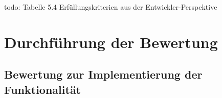 todo: Tabelle 5.4 Erfüllungskriterien aus der Entwickler-Perspektive

\section{Durchführung der Bewertung}

\subsection{Bewertung zur Implementierung der Funktionalität}